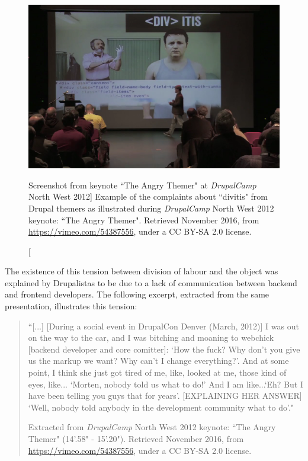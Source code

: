 \begin{figure}[H]
  \centering
\includegraphics[scale=0.42]{img/online/divitis_morten_dcnw2012.png}
\caption[Screenshot from keynote ``The Angry Themer" at \textit{DrupalCamp} North West 2012]%
{Example of the complaints about ``divitis" from Drupal themers as illustrated during \textit{DrupalCamp} North West 2012 keynote: ``The Angry Themer". Retrieved  November 2016, from \url{https://vimeo.com/54387556}, under a CC BY-SA 2.0 license.}
\label{divitis}
\end{figure}

The existence of this tension between division of labour and the object was explained by Drupalistas to be due to a lack of communication between backend and frontend developers. The following excerpt, extracted from the same presentation, illustrates this tension:

\begin{quotation}
``[...] [During a social event in DrupalCon Denver (March, 2012)] I was out on the way to the car, and I was bitching and moaning to webchick [backend developer and core comitter]: `How the fuck? Why don't you give us the markup we want? Why can't I change everything?'. And at some point, I think she just got tired of me, like, looked at me, those kind of eyes, like... `Morten, nobody told us what to do!' And I am like...`Eh? But I have been telling you guys that for years'. [EXPLAINING HER ANSWER] `Well, nobody told anybody in the development community what to do'."
\begin{flushright}\footnotesize{Extracted from \textit{DrupalCamp} North West 2012 keynote: ``The Angry Themer" (14'.58" - 15'.20"). Retrieved  November 2016, from \url{https://vimeo.com/54387556}, under a CC BY-SA 2.0 license.}\end{flushright}
\end{quotation}

